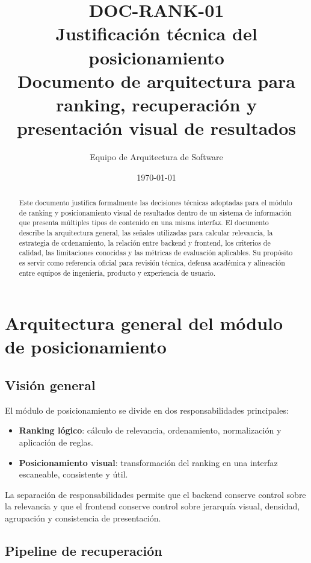 \documentclass[12pt,a4paper]{article}
\title{
    \textbf{DOC-RANK-01}\\
    Justificación técnica del posicionamiento\\
    \large Documento de arquitectura para ranking, recuperación y presentación visual de resultados
}
\author{Equipo de Arquitectura de Software}
\date{\today}
\begin{document}
\maketitle

\begin{abstract}
Este documento justifica formalmente las decisiones técnicas adoptadas para el módulo de ranking y posicionamiento visual de resultados dentro de un sistema de información que presenta múltiples tipos de contenido en una misma interfaz. El documento describe la arquitectura general, las señales utilizadas para calcular relevancia, la estrategia de ordenamiento, la relación entre backend y frontend, los criterios de calidad, las limitaciones conocidas y las métricas de evaluación aplicables. Su propósito es servir como referencia oficial para revisión técnica, defensa académica y alineación entre equipos de ingeniería, producto y experiencia de usuario.
\end{abstract}

\tableofcontents
\newpage



\section{Arquitectura general del módulo de posicionamiento}

\subsection{Visión general}

El módulo de posicionamiento se divide en dos responsabilidades principales:

\begin{itemize}[noitemsep]
    \item \textbf{Ranking lógico}: cálculo de relevancia, ordenamiento, normalización y aplicación de reglas.
    \item \textbf{Posicionamiento visual}: transformación del ranking en una interfaz escaneable, consistente y útil.
\end{itemize}

La separación de responsabilidades permite que el backend conserve control sobre la relevancia y que el frontend conserve control sobre jerarquía visual, densidad, agrupación y consistencia de presentación.

\subsection{Pipeline de recuperación}
\end{document}
